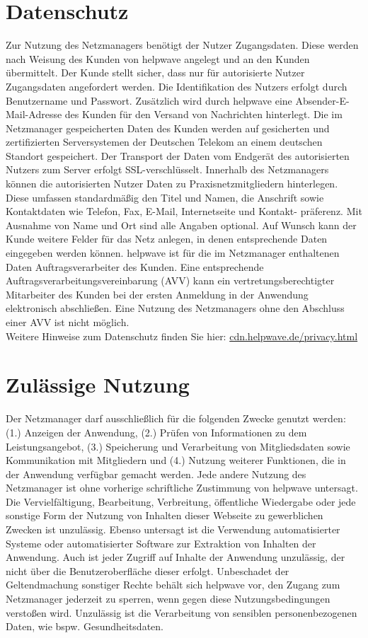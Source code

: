 \documentclass[10pt]{article}
\begin{document}
\section{Datenschutz}
Zur Nutzung des Netzmanagers benötigt der Nutzer Zugangsdaten. Diese werden nach Weisung des Kunden von helpwave
angelegt und an den Kunden übermittelt. Der Kunde stellt sicher, dass nur für autorisierte Nutzer Zugangsdaten angefordert werden. Die Identifikation des Nutzers erfolgt durch Benutzername und Passwort. Zusätzlich wird durch helpwave eine
Absender-E-Mail-Adresse des Kunden für den Versand von Nachrichten hinterlegt. Die im Netzmanager gespeicherten Daten des Kunden werden auf gesicherten und zertifizierten Serversystemen der Deutschen Telekom an einem deutschen
Standort gespeichert. Der Transport der Daten vom Endgerät des autorisierten Nutzers zum Server erfolgt SSL-verschlüsselt.
Innerhalb des Netzmanagers können die autorisierten Nutzer Daten zu Praxisnetzmitgliedern hinterlegen. Diese umfassen
standardmäßig den Titel und Namen, die Anschrift sowie Kontaktdaten wie Telefon, Fax, E-Mail, Internetseite und Kontakt-
präferenz. Mit Ausnahme von Name und Ort sind alle Angaben optional. Auf Wunsch kann der Kunde weitere Felder für das
Netz anlegen, in denen entsprechende Daten eingegeben werden können. helpwave ist für die im Netzmanager enthaltenen Daten Auftragsverarbeiter des Kunden. Eine entsprechende Auftragsverarbeitungsvereinbarung (AVV) kann ein vertretungsberechtigter Mitarbeiter des Kunden bei der ersten Anmeldung in der Anwendung elektronisch abschließen. Eine Nutzung des Netzmanagers ohne den Abschluss einer AVV ist nicht möglich. \\

Weitere Hinweise zum Datenschutz finden Sie hier: \href{https://cdn.helpwave.de/privacy.html}{cdn.helpwave.de/privacy.html}

\section{Zulässige Nutzung}
Der Netzmanager darf ausschließlich für die folgenden Zwecke genutzt werden: (1.) Anzeigen der Anwendung, (2.) Prüfen
von Informationen zu dem Leistungsangebot, (3.) Speicherung und Verarbeitung von Mitgliedsdaten sowie Kommunikation
mit Mitgliedern und (4.) Nutzung weiterer Funktionen, die in der Anwendung verfügbar gemacht werden.
Jede andere Nutzung des Netzmanager ist ohne vorherige schriftliche Zustimmung von helpwave untersagt. Die Vervielfältigung, Bearbeitung, Verbreitung, öffentliche Wiedergabe oder jede sonstige Form der Nutzung von Inhalten dieser Webseite
zu gewerblichen Zwecken ist unzulässig. Ebenso untersagt ist die Verwendung automatisierter Systeme oder automatisierter Software zur Extraktion von Inhalten der Anwendung. Auch ist jeder Zugriff auf Inhalte der Anwendung unzulässig, der
nicht über die Benutzeroberfläche dieser erfolgt. Unbeschadet der Geltendmachung sonstiger Rechte behält sich helpwave
vor, den Zugang zum Netzmanager jederzeit zu sperren, wenn gegen diese Nutzungsbedingungen verstoßen wird. Unzulässig ist die Verarbeitung von sensiblen personenbezogenen Daten, wie bspw. Gesundheitsdaten.
\end{document}
